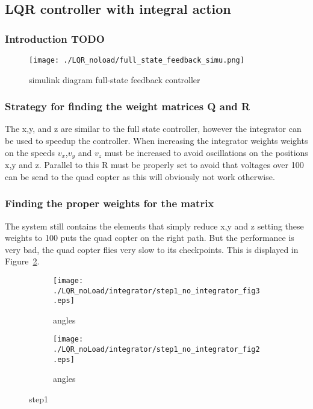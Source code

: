 \subsection{LQR controller with integral action}
\subsubsection{Introduction TODO}


\begin{figure}[H]
	\centering
	\texttt{[image: ./LQR\_noload/full\_state\_feedback\_simu.png]}
	\caption{simulink diagram full-state feedback controller}
	\label{fig:simulink diagram full-state feedback controller}
\end{figure}

\subsubsection{Strategy for finding the weight matrices Q and R}
The x,y, and z are similar to the full state controller, however the integrator can be used to speedup the controller. When increasing the integrator weights weights on the speeds $v_x$,$v_y$ and $v_z$ must be increased to avoid oscillations on the positions x,y and z. Parallel to this R must be properly set to avoid that voltages over 100 can be send to the quad copter as this will obviously not work otherwise.

\subsubsection{Finding the proper weights for the matrix}
The system still contains the elements that simply reduce x,y and z setting these weights to 100 puts the quad copter on the right path. But the performance is very bad, the quad copter flies very slow to its checkpoints. This is displayed in Figure~\ref{fig:step1 integrator}.

\begin{figure}[H]
	\centering
	\begin{subfigure}[b]{0.3\textwidth}
		\texttt{[image: ./LQR\_noLoad/integrator/step1\_no\_integrator\_fig3.eps]}
		\caption{angles}
	\end{subfigure}
	\begin{subfigure}[b]{0.3\textwidth}
		\texttt{[image: ./LQR\_noLoad/integrator/step1\_no\_integrator\_fig2.eps]}
		\caption{angles}
	\end{subfigure}
	\caption{step1}\label{fig:step1 integrator}
\end{figure}

